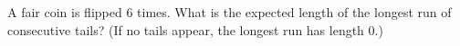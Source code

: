 A fair coin is flipped $6$ times. What is the expected length of the longest run of consecutive tails? (If no tails appear, the longest run has length $0$.)
